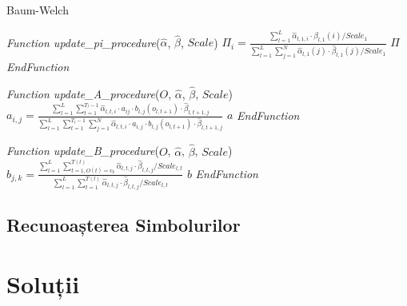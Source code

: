 \documentclass[12pt]{article}
\begin{document}
\begin{algorithm}[H]
  \caption{Baum-Welch}
  \label{alg-baum-welch-2}
  \begin{algorithmic}[1]
    \STATE \emph{Function update\_pi\_procedure}($\hat{\alpha}$,
    $\hat{\beta}$, $Scale$)  \STATE $\Pi_i =
    \frac{\displaystyle\sum_{l=1}^{L}\hat{\alpha}_{l,1,i} \cdot
      \hat{\beta}_{l,1}(i) / Scale_1}
    {\displaystyle\sum_{l=1}^{L}\sum_{j=1}^{N}{\hat{\alpha}_{l,1}(j)
        \cdot \hat{\beta}_{l,1}(j) / Scale_1}}$
    \ENDFOR
    \RETURN $\Pi$ \STATE \emph{EndFunction}
  \end{algorithmic}

  \begin{algorithmic}[1]
    \vspace*{0.5em} \STATE \emph{Function update\_A\_procedure}($O$,
    $\hat{\alpha}$, $\hat{\beta}$, $Scale$) 
     \STATE $a_{i,j} =
    \frac{\displaystyle\sum_{l=1}^{L}\sum_{t=1}^{T_l-1}{
        \hat{\alpha}_{l,t,i}\cdot a_{ij} \cdot b_{l,j}(o_{l,t+1}) \cdot
        \hat{\beta}_{l,t+1,j}}}
    {\displaystyle\sum_{l=1}^{L}\sum_{t=1}^{T_l-1}\sum_{j=1}^{N}{\hat{\alpha}_{l,t,i}\cdot
        a_{i,j} \cdot b_{l,j}(o_{l,t+1}) \cdot \hat{\beta}_{l,t+1,j}}}$
    \ENDFOR
    \ENDFOR
    \RETURN $a$ \STATE \emph{EndFunction}
  \end{algorithmic}

  \begin{algorithmic}[1]
    \vspace*{0.5em} \STATE \emph{Function update\_B\_procedure}($O$, $\hat{\alpha}$,
    $\hat{\beta}$, $Scale$)  
    \STATE $b_{j,k} =
    \frac{\displaystyle\sum_{l=1}^{L}\sum_{t=1,O(t)=v_k}^{T(l)}
      {\hat{\alpha}_{l,t,j} \cdot \hat{\beta}_{l,t,j} / Scale_{l,t}}}
    {\displaystyle\sum_{l=1}^{L}\sum_{t=1}^{T(l)}
      {\hat{\alpha}_{l,t,j} \cdot \hat{\beta}_{l,t,j} / Scale_{l,t}}}$
    \ENDFOR
    \ENDFOR
    \RETURN $b$ \STATE \emph{EndFunction}
  \end{algorithmic}
\end{algorithm}

\subsection{Recunoașterea Simbolurilor}
\label{sec:symbol-recognition}

\section{Soluții}
\label{sec:solutions}
\end{document}
